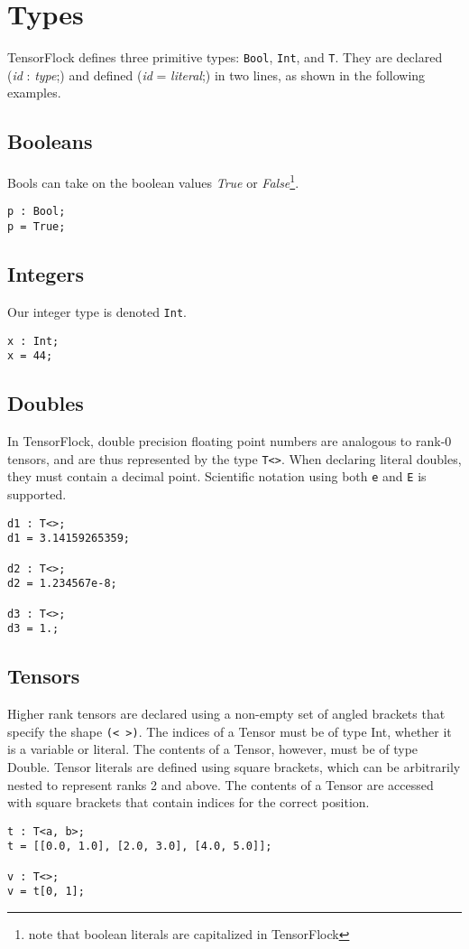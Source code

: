\section{Types}%
\label{sec:types}

TensorFlock defines three primitive types: \verb|Bool|, \verb|Int|, and \verb|T|. 
They are declared \\ (\emph{id} : \emph{type};) and defined (\emph{id} = \emph{literal};) 
in two lines, as shown in the following examples. 

\subsection{Booleans}
Bools can take on the boolean values \emph{True} or \emph{False}\footnote{note that
boolean literals are capitalized in TensorFlock}.
\begin{lstlisting}
p : Bool;
p = True;
\end{lstlisting}

\subsection{Integers}
Our integer type is denoted \verb|Int|.
\begin{lstlisting}
x : Int;
x = 44;
\end{lstlisting}

\subsection{Doubles}
In TensorFlock, double precision floating point numbers are analogous to rank-0
tensors, and are thus represented by the type \verb|T<>|. When declaring
literal doubles, they must contain a decimal point. Scientific notation using
both \verb|e| and \verb|E| is supported.
\begin{lstlisting}
d1 : T<>;
d1 = 3.14159265359;

d2 : T<>;
d2 = 1.234567e-8;

d3 : T<>;
d3 = 1.;
\end{lstlisting}

\subsection{Tensors}
Higher rank tensors are declared using a non-empty set of angled brackets 
that specify the shape \verb|(< >)|. The indices of a Tensor must be of type Int, 
whether it is a variable or literal. The contents of a Tensor, however, 
must be of type Double.  Tensor literals are defined using square brackets, 
which can be arbitrarily nested to represent ranks 2 and above. The contents of a 
Tensor are accessed with square brackets that contain indices for the correct position. 
\begin{lstlisting}
t : T<a, b>;
t = [[0.0, 1.0], [2.0, 3.0], [4.0, 5.0]];

v : T<>;
v = t[0, 1];
\end{lstlisting}


